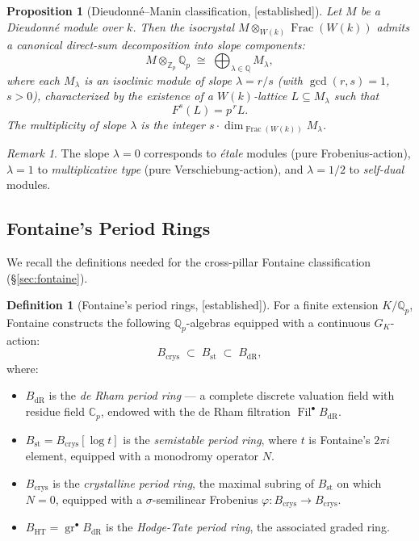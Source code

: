 \documentclass[12pt]{article}
\theoremstyle{definition}
\newtheorem{definition}{Definition}[section]
\theoremstyle{plain}
\newtheorem{proposition}{Proposition}[section]
\theoremstyle{remark}
\newtheorem{remark}{Remark}[section]
\newcommand{\established}{{\color{green!50!black}[\textsf{established}]}}
\newcommand{\Zp}{\mathbb{Z}_p}
\newcommand{\Qp}{\mathbb{Q}_p}
\newcommand{\Cp}{\mathbb{C}_p}
\newcommand{\Bcrys}{B_{\mathrm{crys}}}
\newcommand{\Bst}{B_{\mathrm{st}}}
\newcommand{\BdR}{B_{\mathrm{dR}}}
\newcommand{\BHT}{B_{\mathrm{HT}}}
\begin{document}
\begin{proposition}[Dieudonn\'{e}--Manin classification, \established]
Let $M$ be a Dieudonn\'{e} module over $k$. Then the isocrystal $M\otimes_{W(k)}\operatorname{Frac}(W(k))$ admits a canonical direct-sum decomposition into \emph{slope components}:
\[
M\otimes_{\Zp}\Qp\;\cong\;\bigoplus_{\lambda\in\mathbb{Q}}M_{\lambda},
\]
where each $M_{\lambda}$ is an isoclinic module of slope $\lambda=r/s$ (with $\gcd(r,s)=1$, $s>0$), characterized by the existence of a $W(k)$-lattice $L\subseteq M_{\lambda}$ such that
\[
F^s(L)=p^{\,r}L.
\]
The multiplicity of slope $\lambda$ is the integer $s\cdot\dim_{\operatorname{Frac}(W(k))}M_{\lambda}$.
\end{proposition}

\begin{remark}
The slope $\lambda=0$ corresponds to \emph{\'{e}tale} modules (pure Frobenius-action), $\lambda=1$ to \emph{multiplicative type} (pure Verschiebung-action), and $\lambda=1/2$ to \emph{self-dual} modules.
\end{remark}

\subsection{Fontaine's Period Rings}

We recall the definitions needed for the cross-pillar Fontaine classification (\S\ref{sec:fontaine}).

\begin{definition}[Fontaine's period rings, \established]
For a finite extension $K/\Qp$, Fontaine constructs the following $\Qp$-algebras equipped with a continuous $G_K$-action:
\[
\Bcrys\;\subset\;\Bst\;\subset\;\BdR,
\]
where:
\begin{itemize}[nosep]
  \item $\BdR$ is the \emph{de Rham period ring} — a complete discrete valuation field with residue field $\Cp$, endowed with the de Rham filtration $\operatorname{Fil}^{\bullet}\BdR$.
  \item $\Bst=\Bcrys[\log t]$ is the \emph{semistable period ring}, where $t$ is Fontaine's $2\pi i$ element, equipped with a monodromy operator $N$.
  \item $\Bcrys$ is the \emph{crystalline period ring}, the maximal subring of $\Bst$ on which $N=0$, equipped with a $\sigma$-semilinear Frobenius $\varphi:\Bcrys\to\Bcrys$.
  \item $\BHT=\operatorname{gr}^{\bullet}\BdR$ is the \emph{Hodge-Tate period ring}, the associated graded ring.
\end{itemize}
\end{definition}
\end{document}
